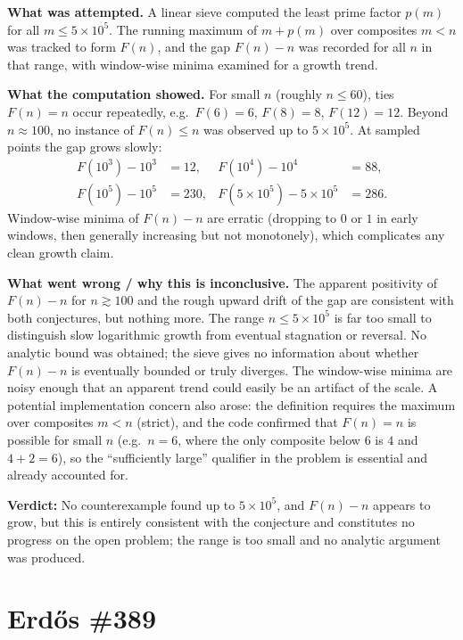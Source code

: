 \documentclass[11pt]{article}
\begin{document}
\textbf{What was attempted.} A linear sieve computed the least prime factor $p(m)$ for all $m \leq 5 \times 10^5$. The running maximum of $m + p(m)$ over composites $m < n$ was tracked to form $F(n)$, and the gap $F(n) - n$ was recorded for all $n$ in that range, with window-wise minima examined for a growth trend.

\textbf{What the computation showed.} For small $n$ (roughly $n \leq 60$), ties $F(n) = n$ occur repeatedly, e.g.\ $F(6) = 6$, $F(8) = 8$, $F(12) = 12$. Beyond $n \approx 100$, no instance of $F(n) \leq n$ was observed up to $5 \times 10^5$. At sampled points the gap grows slowly:
\begin{align*}
F(10^3) - 10^3 &= 12, & F(10^4) - 10^4 &= 88,\\
F(10^5) - 10^5 &= 230, & F(5\times 10^5) - 5\times 10^5 &= 286.
\end{align*}
Window-wise minima of $F(n)-n$ are erratic (dropping to $0$ or $1$ in early windows, then generally increasing but not monotonely), which complicates any clean growth claim.

\textbf{What went wrong / why this is inconclusive.} The apparent positivity of $F(n)-n$ for $n \gtrsim 100$ and the rough upward drift of the gap are consistent with both conjectures, but nothing more. The range $n \leq 5 \times 10^5$ is far too small to distinguish slow logarithmic growth from eventual stagnation or reversal. No analytic bound was obtained; the sieve gives no information about whether $F(n) - n$ is eventually bounded or truly diverges. The window-wise minima are noisy enough that an apparent trend could easily be an artifact of the scale. A potential implementation concern also arose: the definition requires the maximum over composites $m < n$ (strict), and the code confirmed that $F(n) = n$ is possible for small $n$ (e.g.\ $n=6$, where the only composite below $6$ is $4$ and $4+2=6$), so the ``sufficiently large'' qualifier in the problem is essential and already accounted for.

\textbf{Verdict:} No counterexample found up to $5 \times 10^5$, and $F(n)-n$ appears to grow, but this is entirely consistent with the conjecture and constitutes no progress on the open problem; the range is too small and no analytic argument was produced.

\clearpage

\section{Erdős \#389}
\end{document}
